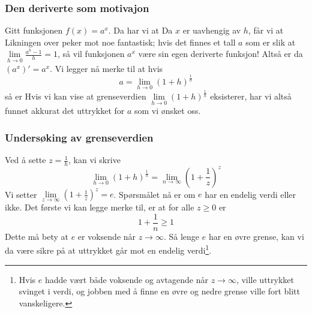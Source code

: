 



	
\subsubsection{Den deriverte som motivajon}
Gitt funksjonen $ f(x)=a^x $. Da har vi at
Da $ x $ er uavhengig av $ h $, får vi at
Likningen over peker mot noe fantastisk; hvis det finnes et tall $ a $ som er slik at $ {\lim\limits_{h\to 0}\frac{a^h-1}{h}=1} $, så vil funksjonen $ a^x $ være sin egen deriverte funksjon! Altså er da $ \left(a^x\right)'=a^x $. Vi legger nå merke til at hvis
\[ a=\lim\limits_{h\to 0}\left(1+h\right)^\frac{1}{h} \]
så er 
Hvis vi kan vise at grenseverdien $ \lim\limits_{h\to 0}\left(1+h\right)^\frac{1}{h} $ eksisterer, har vi altså funnet akkurat det uttrykket for $ a $ som vi ønsket oss.

\subsubsection{Undersøking av grenseverdien}
Ved å sette $ z=\frac{1}{h} $, kan vi skrive
\[ \lim\limits_{h\to0}(1+h)^\frac{1}{h}=\lim\limits_{n\to \infty}\left(1+\frac{1}{z}\right)^z \]
Vi setter $ {\lim\limits_{z\to \infty}\left(1+\frac{1}{z}\right)^z=e}  $. Spørsmålet nå er om $ e $ har en endelig verdi eller ikke. Det første vi kan legge merke til, er at for alle $ {z\geq0 }$ er
\[ 1+\frac{1}{n}\geq1  \]
Dette må bety at $ e $ er voksende når $ {z\to\infty} $. Så lenge $ e $ har en øvre grense, kan vi da være sikre på at uttrykket går mot en endelig verdi\footnote{Hvis $ e $ hadde vært både voksende og avtagende når $ {z\to\infty} $, ville uttrykket svinget i verdi, og jobben med å finne en øvre og nedre grense ville fort blitt vanskeligere.}.\vsk


